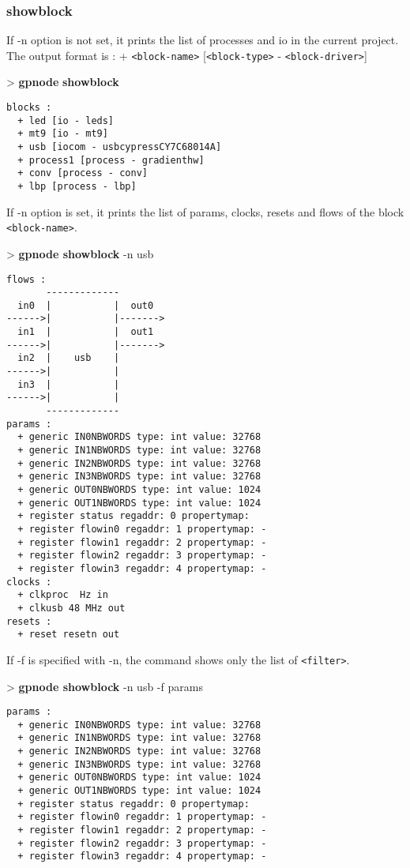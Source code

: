 \documentclass[10pt,a4paper]{article}
\begin{document}
\subsubsection{showblock}

If -n option is not set, it prints the list of processes and io in the current project. The output format is : + \texttt{<block-name>} [\texttt{<block-type>} - \texttt{<block-driver>}]

\begin{sampletitle}
> \textbf{gpnode} \textbf{showblock}
\begin{Verbatim}
blocks :
  + led [io - leds]
  + mt9 [io - mt9]
  + usb [iocom - usbcypressCY7C68014A]
  + process1 [process - gradienthw]
  + conv [process - conv]
  + lbp [process - lbp]
\end{Verbatim}
\end{sampletitle}

If -n option is set, it prints the list of params, clocks, resets and flows of the block \texttt{<block-name>}.

\begin{sampletitle}
> \textbf{gpnode showblock} -n usb
\begin{Verbatim}
flows :
       -------------        
  in0  |           |  out0  
------>|           |------->
  in1  |           |  out1  
------>|           |------->
  in2  |    usb    |        
------>|           |        
  in3  |           |        
------>|           |        
       -------------
params :
  + generic IN0NBWORDS type: int value: 32768
  + generic IN1NBWORDS type: int value: 32768
  + generic IN2NBWORDS type: int value: 32768
  + generic IN3NBWORDS type: int value: 32768
  + generic OUT0NBWORDS type: int value: 1024
  + generic OUT1NBWORDS type: int value: 1024
  + register status regaddr: 0 propertymap: 
  + register flowin0 regaddr: 1 propertymap: -
  + register flowin1 regaddr: 2 propertymap: -
  + register flowin2 regaddr: 3 propertymap: -
  + register flowin3 regaddr: 4 propertymap: -
clocks :
  + clkproc  Hz in
  + clkusb 48 MHz out
resets :
  + reset resetn out
\end{Verbatim}
\end{sampletitle}

If -f is specified with -n, the command shows only the list of \texttt{<filter>}.

\begin{sampletitle}
> \textbf{gpnode showblock} -n usb -f params
\begin{Verbatim}
params :
  + generic IN0NBWORDS type: int value: 32768
  + generic IN1NBWORDS type: int value: 32768
  + generic IN2NBWORDS type: int value: 32768
  + generic IN3NBWORDS type: int value: 32768
  + generic OUT0NBWORDS type: int value: 1024
  + generic OUT1NBWORDS type: int value: 1024
  + register status regaddr: 0 propertymap: 
  + register flowin0 regaddr: 1 propertymap: -
  + register flowin1 regaddr: 2 propertymap: -
  + register flowin2 regaddr: 3 propertymap: -
  + register flowin3 regaddr: 4 propertymap: -
\end{Verbatim}
\end{sampletitle}
\end{document}
